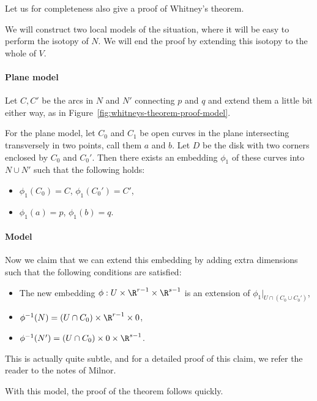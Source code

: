 Let us for completeness also give a proof of Whitney's theorem.
\begin{myproof}
    \label{proof:whitney}
    We will construct two local models of the situation, where it will be easy to perform the isotopy of $N$. We will end the proof by extending this isotopy to the whole of $V$.

    \paragraph{Plane model}
    Let $C, C'$ be the arcs in  $N$ and $N'$ connecting $p$ and  $q$ and extend them a little bit either way, as in Figure~\ref{fig:whitneys-theorem-proof-model}.
    \begin{marginfigure}
        \center
        \caption{On the left: the plane model, on the right: the higher dimensional model.}
        \label{fig:whitneys-theorem-proof-model}
    \end{marginfigure}
    For the plane model, let $C_0$ and $ C_1$ be open curves in the plane intersecting transversely in two points, call them $a$ and $b$.
    Let $D$ be the disk with two corners enclosed by $C_0$ and $C_0'$.
    Then there exists an embedding $\phi_1$ of these curves into $N \cup N'$ such that the following holds:
     \begin{itemize}
         \item $\phi_1(C_0) = C$, $\phi_1(C_0') = C'$,
         \item $\phi_1(a) = p$, $\phi_1(b) = q$.
    \end{itemize}
    \paragraph{Model}
    Now we claim that we can extend this embedding by adding extra dimensions such that the following conditions are satisfied:
    \begin{itemize}
        \item The new embedding $\phi: U \times \R^{r-1} \times \R^{s-1}$ is an extension of $\phi_1|_{U \cap (C_0 \cup C_0')}$,
        \item $\phi^{-1}(N) = (U \cap C_0) \times \R^{r-1} \times 0$,
            \item $\phi^{-1}(N') = (U \cap C_0) \times 0\times \R^{s-1}$.
    \end{itemize}
    This is actually quite subtle, and for a detailed proof of this claim, we refer the reader to the notes of Milnor.
    \begin{marginfigure}
        \centering
        \caption{The isotopy $G_t$ in the plane model moves $C_0$ below $ C_0'$, i.e.\ $ G_1(U \cap C_0) \cap C_0' = \O$.}
        \label{fig:whitneys-theorem-model-isotopy}
    \end{marginfigure}
    With this model, the proof of the theorem follows quickly.

\end{myproof}
